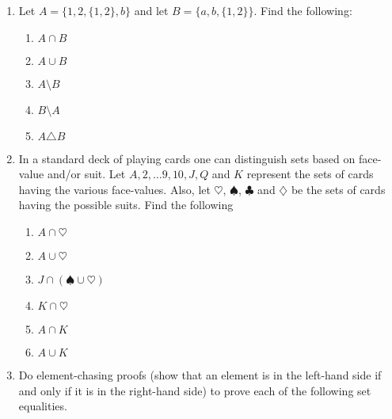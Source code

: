 \begin{enumerate}
\item Let $A = \{1, 2, \{1, 2\}, b\}$ and let $B=\{a, b, \{1, 2\} \}$.
Find the following:
  \begin{enumerate}
  \item \wbitemsep $A \cap B$   
  \item \wbitemsep $A \cup B$ 
  \item \wbitemsep $A \setminus B$ 
  \item \wbitemsep $B \setminus A$ 
  \item \wbitemsep $A \triangle B$ 
  \end{enumerate}

\vfill

\workbookpagebreak

\item In a standard deck of playing cards one can distinguish sets
based on face-value and/or suit.  Let $A, 2, \ldots 9, 10, J, Q$ and $K$
represent the sets of cards having the various face-values.  Also, let
$\heartsuit$, $\spadesuit$, $\clubsuit$ and $\diamondsuit$ be the 
sets of cards having the possible suits.  Find the following
  \begin{enumerate}
  \item \wbitemsep$A \cap \heartsuit$ 
  \item \wbitemsep$A \cup \heartsuit$ 
  \item \wbitemsep$J \cap (\spadesuit \cup \heartsuit)$ 
  \item \wbitemsep$K \cap \heartsuit$ 
  \item \wbitemsep$A \cap K$ \hint{$\emptyset$ }
  \item \wbitemsep$A \cup K$ 
  \end{enumerate}

\vfill

\workbookpagebreak
\hintspagebreak

\item Do element-chasing proofs (show that an element is in the left-hand side if and only if it is in the right-hand side) to prove each of the following set equalities.  


\end{enumerate}
